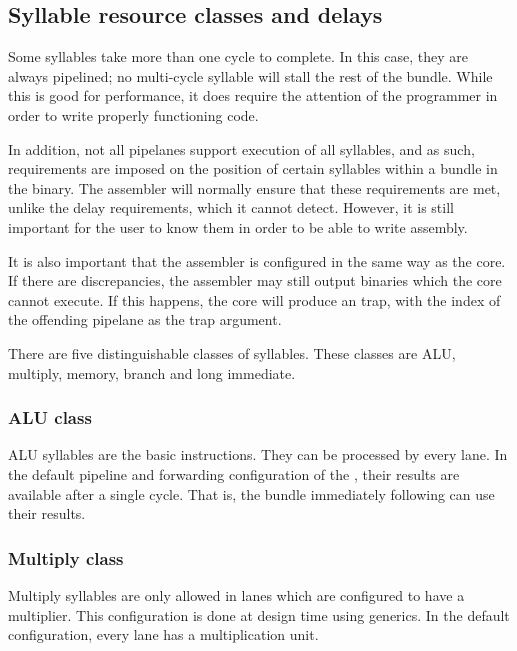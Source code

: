 \subsection{Syllable resource classes and delays}
\label{sec:core-ug-isa-syl-classes}

Some syllables take more than one cycle to complete. In this case, they are
always pipelined; no multi-cycle syllable will stall the rest of the bundle.
While this is good for performance, it does require the attention of the
programmer in order to write properly functioning code.

In addition, not all pipelanes support execution of all syllables, and as such, 
requirements are imposed on the position of certain syllables within a bundle in 
the binary. The assembler will normally ensure that these requirements are met, 
unlike the delay requirements, which it cannot detect. However, it is still 
important for the user to know them in order to be able to write assembly.

It is also important that the assembler is configured in the same way as the
core. If there are discrepancies, the assembler may still output binaries which
the core cannot execute. If this happens, the core will produce an
 trap, with the index of the offending pipelane as the trap
argument.

There are five distinguishable classes of syllables. These classes are ALU,
multiply, memory, branch and long immediate.


\subsubsection{ALU class}
\label{sec:core-ug-isa-syl-classes-alu}

ALU syllables are the basic \rvex{} instructions. They can be processed by every
lane. In the default pipeline and forwarding configuration of the \rvex{}, their
results are available after a single cycle. That is, the bundle immediately
following can use their results.


\subsubsection{Multiply class}
\label{sec:core-ug-isa-syl-classes-mul}

Multiply syllables are only allowed in lanes which are configured to have a
multiplier. This configuration is done at design time using generics. In the
default configuration, every lane has a multiplication unit.


